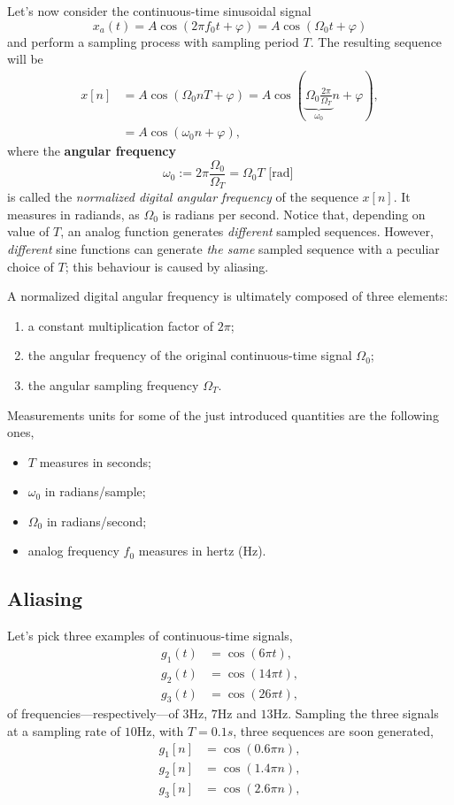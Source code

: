 \documentclass[\documentfontsize, twocolumn]{\classname}
\begin{document}
Let's now consider the con\-ti\-nuo\-us-time sinusoidal signal
\[
    x_a(t) = A\cos{(2\pi f_0 t + \varphi)} = A\cos{(\Omega_0 t + \varphi)}
\]
and perform a sampling process with sampling period $T$.
The resulting se\-quen\-ce will be
\begin{align}
    x[n] &= A\cos{(\Omega_0 n T + \varphi)} = A\cos{(\underbrace{\Omega_0 \frac{2\pi}{\Omega_T}}_{\omega_0} n + \varphi)}, \\
         &= A\cos{(\omega_0 n + \varphi)},
\end{align}
where the \textbf{angular frequency} 
\[
    \omega_0 := 2 \pi \frac {\Omega_0} {\Omega_T} = \Omega_0 T \mbox { [rad] }
\]
is called the \emph{normalized digital angular frequency} of the se\-quen\-ce $x[n]$. It measures in radiands, as $\Omega_0$ is radians per second. Notice that, depending on value of $T$, an analog function generates \emph{different} sampled se\-quen\-ces. However, \emph{different} sine functions can generate \emph{the same} sampled se\-quen\-ce with a peculiar choice of $T$; this behaviour is caused by aliasing.

A normalized digital angular frequency is ultimately composed of three elements:
\begin{enumerate}
    \item a constant multiplication factor of $2\pi$;
    \item the angular frequency of the original continuous-time signal $\Omega_0$;
    \item the angular sampling frequency $\Omega_T$.
\end{enumerate}

Measurements units for some of the just introduced quantities are the following ones,
\begin{itemize}
    \item $T$ measures in seconds;
    \item $\omega_0$ in radians/sample;
    \item $\Omega_0$ in radians/second;
    \item analog frequency $f_0$ measures in hertz (Hz).
\end{itemize}

\subsection{Aliasing}

Let's pick three examples of con\-ti\-nuo\-us-time signals,
\begin{align*}
    g_1(t) &= \cos{(6\pi t)}, \\
    g_2(t) &= \cos{(14\pi t)}, \\
    g_3(t) &= \cos{(26\pi t)},
\end{align*}
of frequencies---respectively---of $3$Hz, $7$Hz and $13$Hz. Sampling the three signals at a sampling rate of $10$Hz, with $T=0.1s$, three se\-quen\-ces are soon generated,
\begin{align*}
    g_1[n] &= \cos{(0.6\pi n)}, \\
    g_2[n] &= \cos{(1.4\pi n)}, \\
    g_3[n] &= \cos{(2.6\pi n)},
\end{align*}
\end{document}
